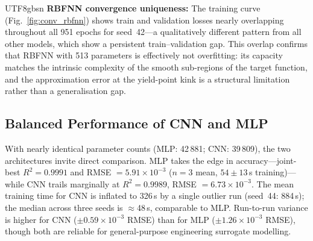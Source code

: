 \documentclass[a4paper,12pt]{report}
\begin{document}
\begin{CJK}{UTF8}{gbsn}
\textbf{RBFNN convergence uniqueness:} The training curve (Fig.~\ref{fig:conv_rbfnn})
shows train and validation losses nearly overlapping throughout all 951 epochs for
seed~42---a qualitatively different pattern from all other models, which show a
persistent train--validation gap. This overlap confirms that RBFNN with 513 parameters
is effectively not overfitting: its capacity matches the intrinsic complexity of the
smooth sub-regions of the target function, and the approximation error at the yield-point
kink is a structural limitation rather than a generalisation gap.

\subsection{Balanced Performance of CNN and MLP}
\label{subsec:cnn_mlp_analysis}

With nearly identical parameter counts (MLP: 42\,881; CNN: 39\,809), the two
architectures invite direct comparison. MLP takes the edge in accuracy---joint-best
$R^2 = 0.9991$ and RMSE $= 5.91 \times 10^{-3}$ ($n=3$ mean, $54 \pm 13$\,s
training)---while CNN trails marginally at $R^2 = 0.9989$,
RMSE $= 6.73 \times 10^{-3}$. The mean training time for CNN is inflated to 326\,s by
a single outlier run (seed~44: 884\,s); the median across three seeds is $\approx$48\,s,
comparable to MLP. Run-to-run variance is higher for CNN
($\pm 0.59 \times 10^{-3}$ RMSE) than for MLP ($\pm 1.26 \times 10^{-3}$ RMSE), though
both are reliable for general-purpose engineering surrogate modelling.


\end{CJK}
\end{document}
